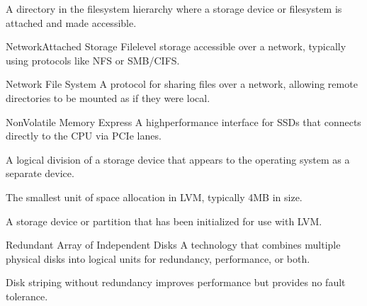 \documentclass[letterpaper,10pt,english]{sphinxmanual}
\begin{document}
\begin{description}
\sphinxAtStartPar
A directory in the filesystem hierarchy where a storage device or filesystem is attached and made accessible.

\sphinxAtStartPar
Network\sphinxhyphen{}Attached Storage \sphinxhyphen{} File\sphinxhyphen{}level storage accessible over a network, typically using protocols like NFS or SMB/CIFS.

\sphinxAtStartPar
Network File System \sphinxhyphen{} A protocol for sharing files over a network, allowing remote directories to be mounted as if they were local.

\sphinxAtStartPar
Non\sphinxhyphen{}Volatile Memory Express \sphinxhyphen{} A high\sphinxhyphen{}performance interface for SSDs that connects directly to the CPU via PCIe lanes.

\sphinxAtStartPar
A logical division of a storage device that appears to the operating system as a separate device.

\sphinxAtStartPar
The smallest unit of space allocation in LVM, typically 4MB in size.

\sphinxAtStartPar
A storage device or partition that has been initialized for use with LVM.

\sphinxAtStartPar
Redundant Array of Independent Disks \sphinxhyphen{} A technology that combines multiple physical disks into logical units for redundancy, performance, or both.

\sphinxAtStartPar
Disk striping without redundancy \sphinxhyphen{} improves performance but provides no fault tolerance.


\end{description}
\end{document}
